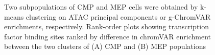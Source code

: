 \documentclass{article}\usepackage[]{graphicx}\usepackage[]{color}
\newenvironment{knitrout}{}{} %
\begin{document}
\begin{enumerate}[label=(\Alph*)]
\begin{knitrout}
\begin{figure}[H]
{}

\caption[Two subpopulations of CMP and MEP cells were obtained by k-means clustering on ATAC principal components or g-ChromVAR enrichments, respectively]{Two subpopulations of CMP and MEP cells were obtained by k-means clustering on ATAC principal components or g-ChromVAR enrichments, respectively. Rank-order plots showing transcription factor binding sites ranked by difference in chromVAR enrichment between the two clusters of (A) CMP and (B) MEP populations}\label{fig:tfRankOrderPlots}
\end{figure}


\end{knitrout}

\end{enumerate}
\end{document}
